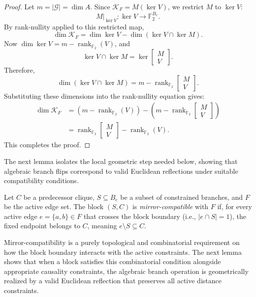 \begin{proof}
Let $m = \lvert \mathcal{G} \rvert = \dim A$. Since $\mathcal{K}_F = M(\ker V)$, we restrict $M$ to $\ker V$:
\[
M\big|_{\ker V} : \ker V \to \mathbb{F}_2^{B_{\mathrm{c}}}.
\]
By rank-nullity applied to this restricted map,
\[
\dim \mathcal{K}_F
=
\dim \ker V
-
\dim(\ker V \cap \ker M).
\]
Now $\dim \ker V = m - \operatorname{rank}_{\mathbb{F}_2}(V)$, and
\[
\ker V \cap \ker M
=
\ker\begin{bmatrix} M \\ V \end{bmatrix}.
\]
Therefore,
\[
\dim(\ker V \cap \ker M)
=
m - \operatorname{rank}_{\mathbb{F}_2}\begin{bmatrix} M \\ V \end{bmatrix}.
\]
Substituting these dimensions into the rank-nullity equation gives:
\[
\begin{aligned}
\dim \mathcal{K}_F &= (m - \operatorname{rank}_{\mathbb{F}_2}(V)) - \left(m - \operatorname{rank}_{\mathbb{F}_2}\begin{bmatrix} M \\ V \end{bmatrix}\right) \\
&= \operatorname{rank}_{\mathbb{F}_2}\begin{bmatrix} M \\ V \end{bmatrix} - \operatorname{rank}_{\mathbb{F}_2}(V).
\end{aligned}
\]
This completes the proof.
\end{proof}

The next lemma isolates the local geometric step needed below, showing that algebraic branch flips correspond to valid Euclidean reflections under suitable compatibility conditions.

\begin{definition}
\label{def:mirror-compatible}
Let $C$ be a predecessor clique, $S \subseteq B_{\mathrm{c}}$ be a subset of constrained branches, and $F$ be the active edge set. The block $(S,C)$ is \emph{mirror-compatible} with $F$ if, for every active edge $e = \{a,b\} \in F$ that crosses the block boundary (i.e., $\lvert e \cap S \rvert = 1$), the fixed endpoint belongs to $C$, meaning $e \setminus S \subseteq C$.
\end{definition}

Mirror-compatibility is a purely topological and combinatorial requirement on how the block boundary interacts with the active constraints. The next lemma shows that when a block satisfies this combinatorial condition alongside appropriate causality constraints, the algebraic branch operation is geometrically realized by a valid Euclidean reflection that preserves all active distance constraints.

